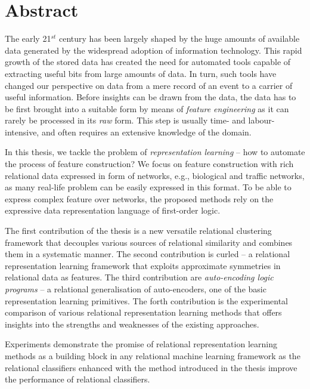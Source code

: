 \chapter{Abstract}                                 \label{ch:abstract}

The early 21$^{st}$ century has been largely shaped by the huge amounts of available data generated by the widespread adoption of information technology.
This rapid growth of the stored data has created the need for automated tools capable of extracting useful bits from large amounts of data.
In turn, such tools have changed our perspective on data from a mere record of an event to a carrier of useful information.
Before insights can be drawn from the data, the data has to be first brought into a suitable form by means of \textit{feature engineering} as it can rarely be processed in its \textit{raw} form.
This step is usually time- and labour-intensive, and often requires an extensive knowledge of the domain.


In this thesis, we tackle the problem of \textit{representation learning} -- how to automate the process of feature construction?
We focus on feature construction with rich relational data expressed in form of networks, e.g., biological and traffic networks, as many real-life problem can be easily expressed in this format.
To be able to express complex feature over networks, the proposed methods rely on the expressive data representation language of first-order logic.


The first contribution of the thesis is a new versatile relational clustering framework that decouples various sources of relational similarity and combines them in a systematic manner.
The second contribution is \gls{curled} -- a relational representation learning framework that exploits approximate symmetries in relational data as features.
The third contribution are \textit{auto-encoding logic programs}  -- a relational generalisation of auto-encoders, one of the basic representation learning primitives.
The forth contribution is the experimental comparison of various relational representation learning methods that offers insights into the strengths and weaknesses of the existing approaches.


Experiments demonstrate the promise of relational representation learning methods as a building block in any relational machine learning framework as the relational classifiers enhanced with the method introduced in the thesis improve the performance of relational classifiers.



\cleardoublepage

